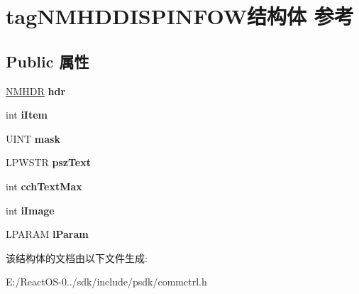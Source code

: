 \hypertarget{structtag_n_m_h_d_d_i_s_p_i_n_f_o_w}{}\section{tag\+N\+M\+H\+D\+D\+I\+S\+P\+I\+N\+F\+O\+W结构体 参考}
\label{structtag_n_m_h_d_d_i_s_p_i_n_f_o_w}
\subsection*{Public 属性}
\begin{DoxyCompactItemize}
\item 
\mbox{\label{structtag_n_m_h_d_d_i_s_p_i_n_f_o_w_aa2e117d110e06c9ee60b11c480634833}} 
\hyperlink{structtag_n_m_h_d_r}{N\+M\+H\+DR} {\bfseries hdr}
\item 
\mbox{\label{structtag_n_m_h_d_d_i_s_p_i_n_f_o_w_aa3abbdebde6dd44370b5156e752567e1}} 
int {\bfseries i\+Item}
\item 
\mbox{\label{structtag_n_m_h_d_d_i_s_p_i_n_f_o_w_ae2892cd9d23927675f7fbc9e2687a027}} 
U\+I\+NT {\bfseries mask}
\item 
\mbox{\label{structtag_n_m_h_d_d_i_s_p_i_n_f_o_w_addf7e62f92fba7d89e271445baebe8b7}} 
L\+P\+W\+S\+TR {\bfseries psz\+Text}
\item 
\mbox{\label{structtag_n_m_h_d_d_i_s_p_i_n_f_o_w_a8e76c85ebc45fbe63295679c04e85574}} 
int {\bfseries cch\+Text\+Max}
\item 
\mbox{\label{structtag_n_m_h_d_d_i_s_p_i_n_f_o_w_a45c02de3792d20e24e6e121f275f1d64}} 
int {\bfseries i\+Image}
\item 
\mbox{\label{structtag_n_m_h_d_d_i_s_p_i_n_f_o_w_a65009845ee2aa1182203538e2690c1e4}} 
L\+P\+A\+R\+AM {\bfseries l\+Param}
\end{DoxyCompactItemize}


该结构体的文档由以下文件生成\+:\begin{DoxyCompactItemize}
\item 
E\+:/\+React\+O\+S-\/0../sdk/include/psdk/commctrl.\+h\end{DoxyCompactItemize}

